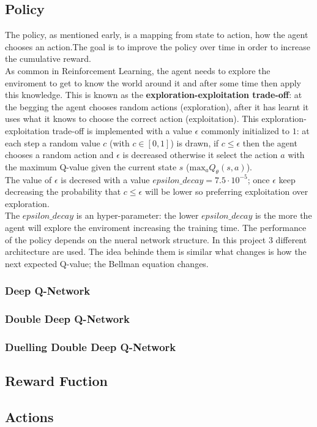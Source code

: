 \documentclass[14pt]{extarticle}
\def\sp{\vspace{5pt}}
\def\pp{\vspace{10pt}\newline}
\begin{document}
\begin{flushleft}
	
	\subsection{Policy}
	\sp
	The policy, as mentioned early, is a mapping from state to action, how the agent chooses an action.The goal is to improve the policy over time in order to increase the cumulative reward.
	\\
	As common in Reinforcement Learning, the agent needs to explore the enviroment to get to know the world around it and after some time then apply this knowledge.  This is known as the \textbf{exploration-exploitation trade-off}: at the begging the agent chooses random actions (exploration), after it has learnt it uses what it knows to choose the correct action (exploitation). \pp
	This exploration-exploitation trade-off is implemented with a value $\epsilon$ commonly initialized to $1$: at each step a random value $c$ (with $c \in [0,1]$) is drawn, if $c\leq\epsilon$ then the agent chooses a random action and $\epsilon$ is decreased otherwise it select the action $a$ with the maximum Q-value given the current state $s$ ($\text{max}_{a}Q_{\theta}(s,a)$).
	\\
	The value of $\epsilon$ is decresed with a value $epsilon\_decay = 7.5 \cdot 10^{-5}$; once $\epsilon$ keep decreasing the probability that $c\leq\epsilon$ will be lower so preferring exploitation over exploration. \\
	The $epsilon\_decay$ is an hyper-parameter: the lower $epsilon\_decay$ is the more the agent will explore the enviroment increasing the training time.
	\pp
	The performance of the policy depends on the nueral network structure. In this project 3 different architecture are used. The idea behinde them is similar what changes is how the next expected Q-value; the Bellman equation changes.
	
	\subsubsection{Deep Q-Network}
	\sp
	\subsubsection{Double Deep Q-Network}
	\sp
	\subsubsection{Duelling Double Deep Q-Network}
	\sp
	
	\subsection{Reward Fuction} \label{rewardfuc}
	\sp
	\subsection{Actions}
	\sp

\end{flushleft}
\end{document}
